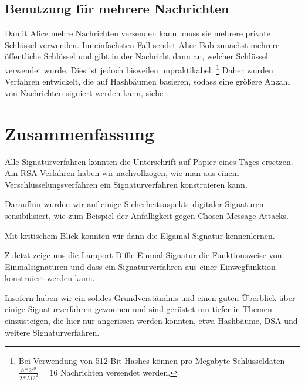 \documentclass[a4paper,12pt,oneside]{scrreprt}
\begin{document}
\section{Benutzung für mehrere Nachrichten}

Damit Alice mehre Nachrichten versenden kann, muss sie mehrere private Schlüssel verwenden. Im einfachsten Fall sendet Alice Bob zunächst mehrere öffentliche Schlüssel und gibt in der Nachricht dann an, welcher Schlüssel verwendet wurde. Dies ist jedoch bisweilen unpraktikabel. \footnote {Bei Verwendung von 512-Bit-Hashes können pro Megabyte Schlüsseldaten $\frac{8*2^{20}}{2*512^2} = 16$ Nachrichten versendet werden.} Daher wurden Verfahren entwickelt, die auf Hashbäumen basieren, sodass eine größere Anzahl von Nachrichten signiert werden kann, siehe \cite{bernstein2009post}. 





\chapter{Zusammenfassung}

Alle Signaturverfahren könnten die Unterschrift auf Papier eines Tages ersetzen. Am RSA-Verfahren haben wir nachvollzogen, wie man aus einem Verschlüsselungsverfahren ein Signaturverfahren konstruieren kann.

Daraufhin wurden wir auf einige Sicherheitsaspekte digitaler Signaturen sensibilisiert, wie zum Beispiel der Anfälligkeit gegen Chosen-Message-Attacks.

Mit kritischem Blick konnten wir dann die Elgamal-Signatur kennenlernen.

Zuletzt zeige uns die Lamport-Diffie-Einmal-Signatur die Funktionsweise von Einmalsignaturen und dass ein Signaturverfahren aus einer Einwegfunktion konstruiert werden kann.

Insofern haben wir ein solides Grundverständnis und einen guten Überblick über einige Signaturverfahren gewonnen und sind gerüstet um tiefer in Themen einzusteigen, die hier nur angerissen werden konnten, etwa Hashbäume, DSA und weitere Signaturverfahren. 





\end{document}
